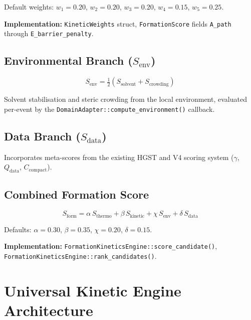 \documentclass[11pt]{article}
\begin{document}
Default weights: $w_1{=}0.20$, $w_2{=}0.20$, $w_3{=}0.20$,
$w_4{=}0.15$, $w_5{=}0.25$.

\textbf{Implementation:} \texttt{KineticWeights} struct,
\texttt{FormationScore} fields \texttt{A\_path} through
\texttt{E\_barrier\_penalty}.

\subsection{Environmental Branch ($S_\text{env}$)}

\begin{equation}
S_\text{env} = \tfrac{1}{2}\left(S_\text{solvent} + S_\text{crowding}\right)
\end{equation}

Solvent stabilisation and steric crowding from the local environment,
evaluated per-event by the \texttt{DomainAdapter::compute\_environment()}
callback.

\subsection{Data Branch ($S_\text{data}$)}

Incorporates meta-scores from the existing HGST and V4 scoring system
($\gamma$, $Q_\text{data}$, $C_\text{compact}$).

\subsection{Combined Formation Score}

\begin{equation}
\label{eq:sform}
S_\text{form} = \alpha\, S_\text{thermo}
              + \beta\, S_\text{kinetic}
              + \chi\, S_\text{env}
              + \delta\, S_\text{data}
\end{equation}

Defaults: $\alpha{=}0.30$, $\beta{=}0.35$, $\chi{=}0.20$, $\delta{=}0.15$.

\textbf{Implementation:} \texttt{FormationKineticsEngine::score\_candidate()},
\texttt{FormationKineticsEngine::rank\_candidates()}.

\section{Universal Kinetic Engine Architecture}
\label{sec:universal}
\end{document}
